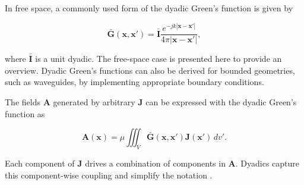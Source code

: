 In free space, a commonly used form of the dyadic Green’s function is given by \cite[p.~92]{Collin_2015}

\begin{equation}\label{eqn:dyadic_final}
	\mathbf{\bar G}(\mathbf{x}, \mathbf{x'}) = \mathbf{\bar I} \frac{e^{-jk|\mathbf{x} - \mathbf{x'}|}}{4\pi |\mathbf{x} - \mathbf{x'}|},
\end{equation}

where $\mathbf{\bar{I}}$ is a unit dyadic. The free-space case is presented here to provide an overview. Dyadic Green’s functions can also be derived for bounded geometries, such as waveguides, by implementing appropriate boundary conditions.

The fields $\mathbf{A}$ generated by arbitrary $\mathbf{J}$ can be expressed with the dyadic Green's function as

\begin{equation}
	\mathbf{A}(\mathbf{x}) = \mu \iiint_V \mathbf{\bar{G}}\left(\mathbf{x}, \mathbf{x'}\right)\mathbf{J}(\mathbf{x'})\,dv'.
\end{equation}

Each component of $\mathbf{J}$ drives a combination of components in $\mathbf{A}$. Dyadics capture this component-wise coupling and simplify the notation \cite[p. 92]{Collin_2015}.




